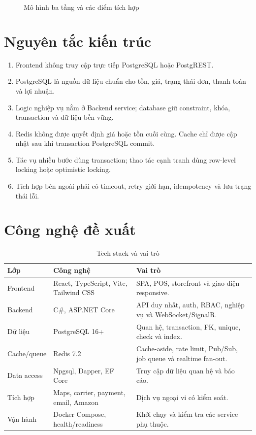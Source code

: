 \documentclass[12pt,a4paper]{report}
\begin{document}
\begin{figure}[H]
\centering
{}
\caption{Mô hình ba tầng và các điểm tích hợp}
\label{fig:architecture}
\end{figure}

\section{Nguyên tắc kiến trúc}
\begin{enumerate}
  \item Frontend không truy cập trực tiếp PostgreSQL hoặc PostgREST.
  \item PostgreSQL là nguồn dữ liệu chuẩn cho tồn, giá, trạng thái đơn, thanh toán và lợi nhuận.
  \item Logic nghiệp vụ nằm ở Backend service; database giữ constraint, khóa, transaction và dữ liệu bền vững.
  \item Redis không được quyết định giá hoặc tồn cuối cùng. Cache chỉ được cập nhật sau khi transaction PostgreSQL commit.
  \item Tác vụ nhiều bước dùng transaction; thao tác cạnh tranh dùng row-level locking hoặc optimistic locking.
  \item Tích hợp bên ngoài phải có timeout, retry giới hạn, idempotency và lưu trạng thái lỗi.
\end{enumerate}

\section{Công nghệ đề xuất}
\begin{table}[H]
\centering
\begin{tabularx}{\textwidth}{P{4.0cm}P{3.7cm}Y}
\toprule
Lớp & Công nghệ & Vai trò\\
\midrule
Frontend & React, TypeScript, Vite, Tailwind CSS & SPA, POS, storefront và giao diện responsive.\\
Backend & C\#, ASP.NET Core & API duy nhất, auth, RBAC, nghiệp vụ và WebSocket/SignalR.\\
Dữ liệu & PostgreSQL 16+ & Quan hệ, transaction, FK, unique, check và index.\\
Cache/queue & Redis 7.2 & Cache-aside, rate limit, Pub/Sub, job queue và realtime fan-out.\\
Data access & Npgsql, Dapper, EF Core & Truy cập dữ liệu quan hệ và báo cáo.\\
Tích hợp & Maps, carrier, payment, email, Amazon & Dịch vụ ngoại vi có kiểm soát.\\
Vận hành & Docker Compose, health/readiness & Khởi chạy và kiểm tra các service phụ thuộc.\\
\bottomrule
\end{tabularx}
\caption{Tech stack và vai trò}
\end{table}
\end{document}
